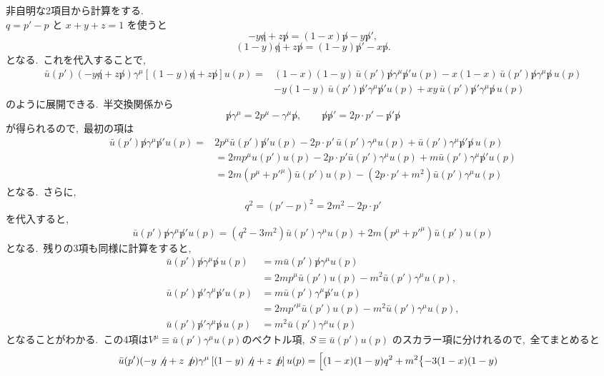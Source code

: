 \documentclass[uplatex,dvipdfmx,a4paper,11pt]{jsarticle}
\begin{document}
\begin{myproof}
  非自明な2項目から計算をする.~\\
  \(q=p'-p\) と \(x+y+z=1\) を使うと
\[
-y\not q+z\not p=(1-x)\not p-y\not p',
\]
\[
(1-y)\not q+z\not p=(1-y)\not p'-x\not p.
\]
となる.~これを代入することで,~
\[
\begin{aligned}
\bar u(p')
(-y\not q+z\not p)\gamma^\mu
\left[(1-y)\not q+z\not p\right]u(p)
={}&
(1-x)(1-y)\,
\bar u(p')\not p\gamma^\mu\not p'u(p)
-x(1-x)\,
\bar u(p')\not p\gamma^\mu\not p\,u(p)
\\
&-y(1-y)\,
\bar u(p')\not p'\gamma^\mu\not p'u(p)
+xy\,
\bar u(p')\not p'\gamma^\mu\not p\,u(p)
\end{aligned}
\]
のように展開できる.~半交換関係から
\[
\not p\gamma^\mu=2p^\mu-\gamma^\mu\not p,
\qquad
\not p\not p'=2p\cdot p'-\not p'\not p
\]
が得られるので,~最初の項は
\[
\begin{aligned}
\bar u(p')\not p\gamma^\mu\not p'u(p)
={}&
2p^\mu\bar u(p')\not p'u(p)
-2p\cdot p'\,\bar u(p')\gamma^\mu u(p)
+\bar u(p')\gamma^\mu\not p'\not p\,u(p)\\
&=2m p^\mu u(p')u(p) - 2p\cdot p' \bar u(p')\gamma^\mu u(p) + m\bar u(p')\gamma^\mu \not p' u(p)\\
&=2m (p^\mu + p'^\mu)\bar u(p') u(p) -(2p\cdot p' +m^2)\bar u(p')\gamma^\mu u(p)
\end{aligned}
\]
となる.~さらに,~
\[
q^2=(p'-p)^2=2m^2-2p\cdot p'
\]
を代入すると,~
\[
\bar u(p')\not p\gamma^\mu\not p'u(p)
=(q^2-3m^2)\bar u(p')\gamma^\mu u(p) +2m(p^\mu + p'^\mu) \bar u(p') u(p)
\]
となる.~残りの3項も同様に計算をすると,~
\[
\begin{aligned}
\bar u(p')\not p\gamma^\mu\not p\,u(p)
&=m\bar u(p')\not p\gamma^\mu u(p)\\
&=2mp^\mu \bar u(p') u(p)-m^2\bar u(p')\gamma^\mu u(p),
\\[4pt]
\bar u(p')\not p'\gamma^\mu\not p'u(p)
&=m\bar u(p')\gamma^\mu\not p'u(p)\\
&=2mp'^\mu \bar u(p') u(p)-m^2\bar u(p')\gamma^\mu u(p),
\\[4pt]
\bar u(p')\not p'\gamma^\mu\not p\,u(p)
&=m^2\bar u(p')\gamma^\mu u(p)
\end{aligned}
\tag{4}
\]
となることがわかる.~この4項は$V^\mu \equiv \bar u(p')\gamma^\mu u(p)$のベクトル項,~$S \equiv \bar u(p') u(p)$ のスカラー項に分けれるので,~全てまとめると
\[
\begin{aligned}
\bar u(p')
(-y\not q+z\not p)\gamma^\mu
\left[(1-y)\not q+z\not p\right]u(p)={}&
\Bigl[
(1-x)(1-y)q^2
+m^2\bigl\{
-3(1-x)(1-y)

\end{aligned}\]
\end{myproof}
\end{document}
